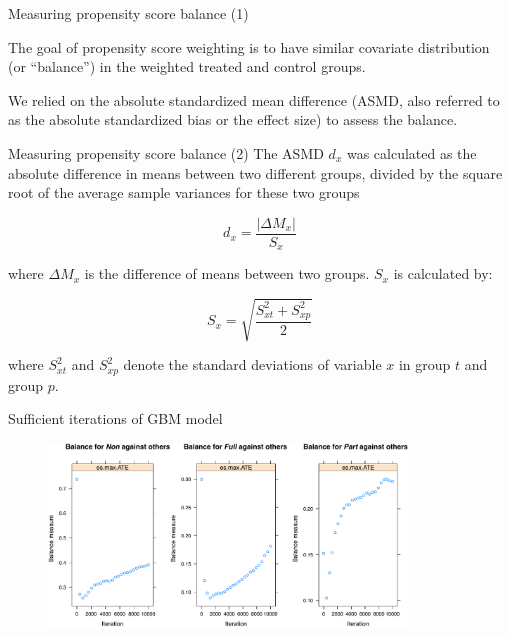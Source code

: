 \documentclass[10pt, compress]{beamer}
\begin{document}
\begin{frame}{Measuring propensity score balance (1)}

The goal of propensity score weighting is to have similar covariate distribution (or ``balance'') in the weighted treated and control groups. 

We relied on the absolute standardized mean difference (ASMD, also referred to as the absolute standardized bias or the effect size) to assess the balance. 


\end{frame}

\begin{frame}{Measuring propensity score balance (2)}
The ASMD $d_x$ was calculated as the absolute difference in means between two different groups, divided by the square root of the average sample variances for these two groups

\begin{equation*}
d_x =\frac{|\Delta M_x|}{S_x}
\end{equation*}

where $\Delta M_x$ is the difference of means between two groups. $S_x$ is calculated by: 

\begin{equation*}
S_x=\sqrt{\frac{S^2_{xt}+S^2_{xp}}{2}}
\end{equation*}

where $S^2_{xt}$ and $S^2_{xp}$ denote the standard deviations of variable $x$ in group $t$ and group $p$.

\end{frame}

\begin{frame}{Sufficient iterations of GBM model}

\begin{figure}
\centering

   \includegraphics[width= 0.85\textwidth]{psdiag1.pdf}

\end{figure}
\end{frame}
\end{document}
